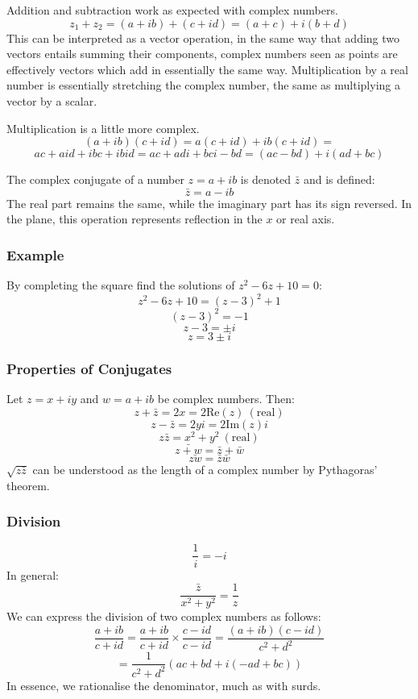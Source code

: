 \documentclass[12pt]{report}
\begin{document}
\begin{flushleft}
\bigskip
Addition and subtraction work as expected with complex numbers.
\[z_1 + z_2 = (a + ib) + (c + id) = (a + c) + i(b + d)\]
This can be interpreted as a vector operation, in the same way that adding 
two vectors entails summing their components, complex numbers seen as points 
are effectively vectors which add in essentially the same way. Multiplication 
by a real number is essentially stretching the complex number, the same as 
multiplying a vector by a scalar.

\bigskip
Multiplication is a little more complex.
\[(a + ib)(c + id) = a(c +id) + ib(c + id) =\]
\[ac + aid + ibc + ibid = ac + adi + bci - bd = (ac -bd) + i(ad + bc)\]

The complex conjugate of a number \(z = a + ib\) is denoted \(\bar{z}\) and 
is defined:
\[\bar{z} = a - ib\]
The real part remains the same, while the imaginary part has its sign reversed.
In the plane, this operation represents reflection in the \(x\) or real axis.

\subsubsection*{Example}
By completing the square find the solutions of \(z^2 - 6z + 10 = 0\):
\[z^2 - 6z + 10 = (z - 3)^2 + 1\]
\[(z - 3)^2 = -1\]
\[z - 3 = \pm i\]
\[z = 3 \pm i\]

\subsubsection*{Properties of Conjugates}
Let \(z = x + iy\) and \(w = a + ib\) be complex numbers. Then:
\[z + \bar{z} = 2x = 2\mathrm{Re}(z)\:\mathrm{(real)}\]
\[z - \bar{z} = 2yi = 2 \mathrm{Im}(z)i\]
\[z\bar{z} = x^2 + y^2\:\mathrm{(real)}\]
\[\bar{z + w} = \bar{z} + \bar{w}\]
\[\bar{zw} = \bar{z}\bar{w}\]
\(\sqrt{z\bar{z}}\) can be understood as the length of a complex number by 
Pythagoras' theorem.

\subsubsection*{Division}
\[\frac{1}{i} = -i\]
In general:
\[\frac{\bar{z}}{x^2 + y^2} = \frac{1}{z}\]
We can express the division of two complex numbers as follows:
\[\frac{a + ib}{c + id} = \frac{a + ib}{c + id}\times\frac{c - id}{c - id} = 
\frac{(a + ib)(c - id)}{c^2 + d^2}\]
\[= \frac{1}{c^2 + d^2}(ac + bd + i(-ad + bc))\]
In essence, we rationalise the denominator, much as with surds.


\end{flushleft}
\end{document}
